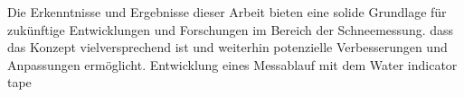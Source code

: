 Die Erkenntnisse und Ergebnisse dieser Arbeit bieten eine solide Grundlage für zukünftige Entwicklungen und Forschungen im Bereich der Schneemessung. dass das Konzept vielversprechend ist und weiterhin potenzielle Verbesserungen und Anpassungen ermöglicht.
Entwicklung eines Messablauf mit dem Water indicator tape
